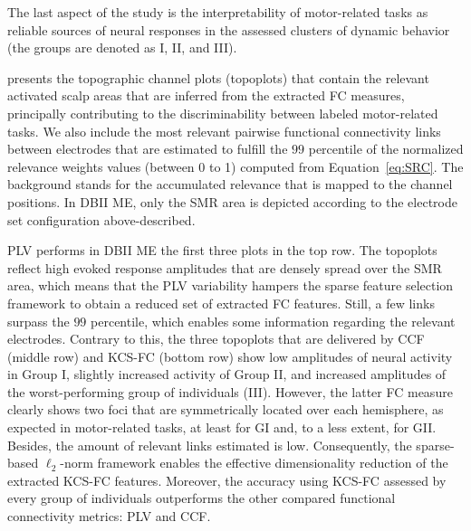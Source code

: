 The last aspect of the study is the interpretability of motor-related tasks as reliable sources of neural responses in the assessed clusters of dynamic behavior (the groups are denoted as I, II, and III).

{ presents the topographic channel plots (topoplots) that contain the relevant activated scalp areas that are inferred from the extracted FC measures, principally contributing to the discriminability between labeled motor-related tasks. We also include the most relevant pairwise functional connectivity links between electrodes that are estimated to fulfill the $99$ percentile of the normalized relevance weights values (between 0 to 1) computed from Equation~\eqref{eq:SRC}. The background stands for the accumulated relevance that is mapped to the channel positions.} In DBII ME, only the SMR area is depicted according to the electrode set configuration above-described. 

PLV performs in DBII ME the first three plots in the top row. The topoplots reflect high evoked response amplitudes that are densely spread over the SMR area, which means that the PLV variability hampers the sparse feature selection framework to obtain a reduced set of extracted FC features. Still, a few links surpass the $99$ percentile, which enables some information regarding the relevant electrodes. Contrary to this, the three topoplots that are delivered by CCF (middle row) and KCS-FC (bottom row) show low amplitudes of neural activity in Group I, slightly increased activity of Group II, and increased amplitudes of the worst-performing group of individuals (III). However, the latter FC measure clearly shows two foci that are symmetrically located over each hemisphere, as expected in motor-related tasks, at least for GI and, to a less extent, for GII. Besides, the amount of relevant links estimated is low. Consequently, the sparse-based $\ell_2$-norm framework enables the effective dimensionality reduction of the extracted KCS-FC features. Moreover, the accuracy using KCS-FC assessed by every group of individuals outperforms the other compared functional connectivity metrics: PLV and CCF. 

